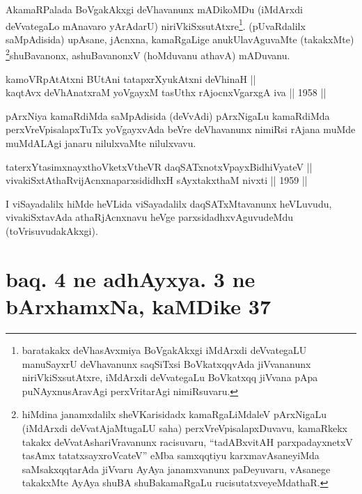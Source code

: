 \begin{artha}
AkamaRPalada BoVgakAkxgi deVhavanunx mADikoMDu (iMdArxdi deVvategaLo
mAnavaro yArAdarU) niriVkiSxsutAtxre\footnote{baratakakx
deVhasAvxmiya BoVgakAkxgi iMdArxdi deVvategaLU manuSayxrU
deVhavanunx saqSiTxsi BoVkatxqqvAda jiVvananunx niriVkiSxsutAtxre,
iMdArxdi deVvategaLu BoVkatxqq jiVvana pApa puNAyxnusAravAgi
perxVritarAgi nimiRsuvaru.}. (pUvaRdalilx
saMpAdisida) upAsane, jAcnxna, kamaRgaLige anukUlavAguvaMte
(takakxMte) \footnote{hiMdina janamxdalilx sheVKarisidadx kamaRgaLiMdaleV pArxNigaLu (iMdArxdi deVvatAjaMtugaLU saha) perxVreVpisalapxDuvavu, kamaRkekx takakx deVvatAshariVravanunx racisuvaru, ``tadABxvitAH parxpadayxnetxV tasAmx tatatxsayxroVcateV'' eMba samxqqtiyu karxmavAsaneyiMda saMsakxqqtarAda jiVvaru AyAya janamxvanunx paDeyuvaru, vAsanege takakxMte AyAya shuBA shuBakamaRgaLu rucisutatxveyeMdathaR.}shuBavanonx, ashuBavanonxV (hoMduvanu athavA) mADuvanu.
\end{artha}

\begin{shl}
kamoVRpAtAtxni BUtAni tatapxrXyukAtxni deVhinaH || \\
kaqtAvx deVhAnatxraM yoVgayxM tasUthx rAjocnxV\s garxgA iva \hfill || 1958 ||
  
\end{shl}

\begin{artha}
pArxNiya kamaRdiMda saMpAdisida (deVvAdi) pArxNigaLu kamaRdiMda
perxVreVpisalapxTuTx yoVgayxvAda beVre deVhavanunx nimiRsi rAjana
muMde muMdALAgi janaru nilulxvaMte nilulxvavu.
\end{artha}

\begin{shl}
taterxYtasimxnayxthoVketxV\s theVR daqSATxnotxV\s payxBidhiVyateV ||  \\
vivakiSxtAthaRvijAcnxnaparxsididhxH sAyxtakxthaM nivxti \hfill || 1959 ||
  
\end{shl}

\begin{artha}
I viSayadalilx hiMde heVLida viSayadalilx daqSATxMtavanunx
heVLuvudu, vivakiSxtavAda athaRjAcnxnavu heVge parxsidadhxvAguvudeMdu
(toVrisuvudakAkxgi).
\end{artha}

\section*{baq. 4 ne adhAyxya. 3 ne bArxhamxNa, kaMDike 37}

